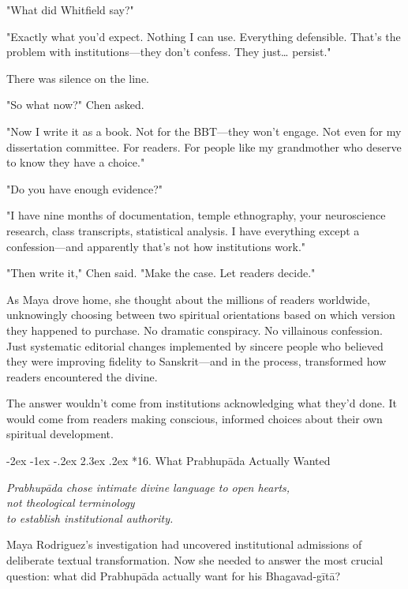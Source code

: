 \documentclass[12pt,twoside]{book}
\makeatletter
\def\cleardoublepage{\clearpage\if@twoside \ifodd\c@page\else\hbox{}\thispagestyle{empty}\newpage\if@twocolumn\hbox{}\newpage\fi\fi\fi}
\renewcommand\section{\@startsection{section}{1}{\z@}%
{-2ex \@plus -1ex \@minus -.2ex}%
{2.3ex \@plus.2ex}%
{\normalfont\Large\bfseries}}
\makeatother
\begin{document}
"What did Whitfield say?"

"Exactly what you'd expect. Nothing I can use. Everything defensible. That's the problem with institutions—they don't confess. They just\ldots{} persist."

There was silence on the line.

"So what now?" Chen asked.

"Now I write it as a book. Not for the BBT—they won't engage. Not even for my dissertation committee. For readers. For people like my grandmother who deserve to know they have a choice."

"Do you have enough evidence?"

"I have nine months of documentation, temple ethnography, your neuroscience research, class transcripts, statistical analysis. I have everything except a confession—and apparently that's not how institutions work."

"Then write it," Chen said. "Make the case. Let readers decide."

As Maya drove home, she thought about the millions of readers worldwide, unknowingly choosing between two spiritual orientations based on which version they happened to purchase. No dramatic conspiracy. No villainous confession. Just systematic editorial changes implemented by sincere people who believed they were improving fidelity to Sanskrit—and in the process, transformed how readers encountered the divine.

The answer wouldn't come from institutions acknowledging what they'd done. It would come from readers making conscious, informed choices about their own spiritual development.

\cleardoublepage
\vspace*{0.20\textheight}
\section*{16. What Prabhupāda Actually Wanted}
\thispagestyle{chapterpage}

{\centering\itshape Prabhupāda chose intimate divine language to open hearts,\\not theological terminology\\to establish institutional authority.\par}
\vspace{0.3cm}

\normalfont\justifying
Maya Rodriguez's investigation had uncovered institutional admissions of deliberate textual transformation. Now she needed to answer the most crucial question: what did Prabhupāda actually want for his Bhagavad-gītā?
\end{document}
